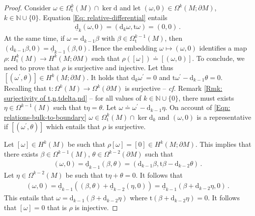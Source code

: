 \begin{proof}
	Consider $\omega\in\Omega^k_{\mathrm{t}}(M)\cap\ker\mathrm{d}$ and let $(\omega,0)\in\Omega^k(M;\partial M)$, $k\in\mathbb{N}\cup\{0\}$. Equation \eqref{Eq: relative-differential} entails
	\begin{align*}
	\underline{\mathrm{d}}_k(\omega,0)=(\mathrm{d}_k\omega,\mathrm{t}\omega)=(0,0)\,.
	\end{align*}
	At the same time, if $\omega=\mathrm{d}_{k-1}\beta$ with $\beta\in\Omega_\mathrm{t}^{k-1}(M)$, then $(\mathrm{d}_{k-1}\beta,0)=\underline{\mathrm{d}}_{k-1}(\beta,0)$.
	Hence the embedding $\omega\mapsto (\omega,0)$ identifies a map $\rho: H^k_{\mathrm{t}}(M)\to  H^k(M;\partial M)$ such that $\rho([\omega])\doteq [(\omega,0)]$.	
	To conclude, we need to prove that $\rho$ is surjective and injective.
	Let thus $[(\omega^\prime,\theta)]\in H^k(M;\partial M)$.
	It holds that $\mathrm{d}_k\omega^\prime=0$ and $\mathrm{t}\omega^\prime-\mathrm{d}_{k-1}\theta=0$.
	Recalling that $\mathrm{t}:\Omega^k(M)\to\Omega^k(\partial M)$ is surjective -- \textit{cf.} Remark \ref{Rmk: surjectivity of t,n,tdelta,nd} -- for all values of $k\in\mathbb{N}\cup\{0\}$, there must exists $\eta\in\Omega^{k-1}(M)$ such that $\mathrm{t}\eta=\theta$.
	Let $\omega\doteq\omega^\prime -\mathrm{d}_{k-1}\eta$.
	On account of \eqref{Eqn: relations-bulk-to-boundary} $\omega\in\Omega^k_{\mathrm{t}}(M)\cap\ker\mathrm{d}_k$ and $(\omega, 0)$ is a representative if $[(\omega^\prime,\theta)]$ which entails that $\rho$ is surjective.
	
	Let $[\omega]\in H^k(M)$ be such that $\rho[\omega]=[0]\in H^k(M;\partial M)$.
	This implies that there exists $\beta\in\Omega^{k-1}(M)$, $\theta\in\Omega^{k-2}(\partial M)$ such that
	\begin{align*}
	(\omega,0)=
	\underline{\mathrm{d}}_{k-1}(\beta,\theta)=
	(\mathrm{d}_{k-1}\beta,\mathrm{t}\beta-\mathrm{d}_{k-2}\theta)\,.
	\end{align*}
	Let $\eta\in\Omega^{k-2}(M)$ be such that $\mathrm{t}\eta+\theta=0$.
	It follows that
	\begin{align*}
	(\omega,0)=
	\underline{\mathrm{d}}_{k-1}\left((\beta,\theta)+
	\underline{\mathrm{d}}_{k-2}(\eta,0)\right)=
	\underline{\mathrm{d}}_{k-1}(\beta+\mathrm{d}_{k-2}\eta,0)\,.
	\end{align*}
	This entails that $\omega=\mathrm{d}_{k-1}(\beta+\mathrm{d}_{k-2}\eta)$ where $\mathrm{t}(\beta+\mathrm{d}_{k-2}\eta)=0$.
	It follows that $[\omega]=0$ that is $\rho$ is injective.
	
\end{proof}

